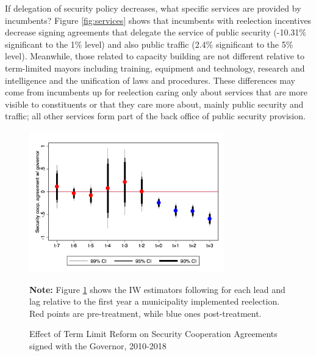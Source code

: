 \documentclass[12pt]{amsart}
\numberwithin{equation}{section}
\theoremstyle{definition}
\theoremstyle{definition}
\theoremstyle{definition}
\begin{document}
     
If delegation of security policy decreases, what specific services are provided by incumbents? Figure \ref{fig:services} shows that incumbents with reelection incentives decrease signing agreements that delegate the service of public security (-10.31\% significant to the 1\% level) and also public traffic (2.4\% significant to the 5\% level). Meanwhile, those related to capacity building are not different relative to term-limited mayors including training, equipment and technology, research and intelligence and the unification of laws and procedures. These differences may come from incumbents up for reelection caring only about services that are more visible to constituents or that they care more about, mainly public security and traffic; all other services form part of the back office of public security provision.  

\begin{figure}[h] 
\centering
 \caption{Effect of Term Limit Reform on Security Cooperation Agreements signed with the Governor, 2010-2018}
 \label{fig:event_study_agreements}
\includegraphics[width=0.75\textwidth]{Figures/catts_agreements.png}
       \captionsetup{justification=centering}
       
 \textbf{Note:} Figure \ref{fig:event_study_agreements} shows the IW estimators following \citet{abraham_sun_2020} for each lead and lag relative to the first year a municipality implemented reelection. Red points are pre-treatment, while blue ones post-treatment. 
     
\end{figure}   
\end{document}

